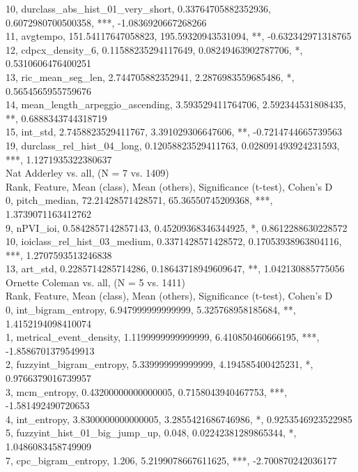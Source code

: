 10, durclass_abs_hist_01_very_short, 0.33764705882352936, 0.6072980700500358, ***, -1.0836920667268266\\
11, avgtempo, 151.54117647058823, 195.59320943531094, **, -0.632342971318765\\
12, cdpcx_density_6, 0.11588235294117649, 0.08249463902787706, *, 0.5310606476400251\\
13, ric_mean_seg_len, 2.744705882352941, 2.2876983559685486, *, 0.5654565955759676\\
14, mean_length_arpeggio_ascending, 3.593529411764706, 2.592344531808435, **, 0.6888343744318719\\
15, int_std, 2.7458823529411767, 3.391029306647606, **, -0.7214744665739563\\
19, durclass_rel_hist_04_long, 0.12058823529411763, 0.028091493924231593, ***, 1.1271935322380637\\
Nat Adderley vs. all, (N = 7 vs. 1409)\\
Rank, Feature, Mean (class), Mean (others), Significance (t-test), Cohen's D\\
0, pitch_median, 72.21428571428571, 65.36550745209368, ***, 1.3739071163412762\\
9, nPVI_ioi, 0.5842857142857143, 0.45209368346344925, *, 0.8612288630228572\\
10, ioiclass_rel_hist_03_medium, 0.3371428571428572, 0.17053938963804116, ***, 1.2707593513246838\\
13, art_std, 0.2285714285714286, 0.18643718949609647, **, 1.042130885775056\\
Ornette Coleman vs. all, (N = 5 vs. 1411)\\
Rank, Feature, Mean (class), Mean (others), Significance (t-test), Cohen's D\\
0, int_bigram_entropy, 6.947999999999999, 5.325768958185684, **, 1.4152194098410074\\
1, metrical_event_density, 1.1199999999999999, 6.410850460666195, ***, -1.8586701379549913\\
2, fuzzyint_bigram_entropy, 5.339999999999999, 4.194585400425231, *, 0.9766379016739957\\
3, mcm_entropy, 0.43200000000000005, 0.7158043940467753, ***, -1.581492490720653\\
4, int_entropy, 3.8300000000000005, 3.2855421686746986, *, 0.9253546923522985\\
5, fuzzyint_hist_01_big_jump_up, 0.048, 0.02242381289865344, *, 1.0486083458749909\\
7, cpc_bigram_entropy, 1.206, 5.2199078667611625, ***, -2.700870242036177\\

